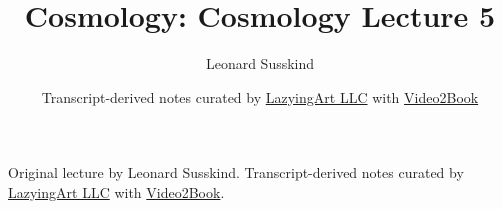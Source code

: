 \documentclass[11pt,oneside]{book}
\begin{document}
\frontmatter
\title{Cosmology: Cosmology Lecture 5}
\author{Leonard Susskind}
\date{Transcript-derived notes curated by \href{https://lazying.art}{LazyingArt LLC} with \href{https://github.com/lachlanchen/Video2Book}{Video2Book}}
\maketitle
\begin{center}
\small Original lecture by Leonard Susskind. Transcript-derived notes curated by \href{https://lazying.art}{LazyingArt LLC} with \href{https://github.com/lachlanchen/Video2Book}{Video2Book}.
\end{center}
\clearpage
\mainmatter

\end{document}
